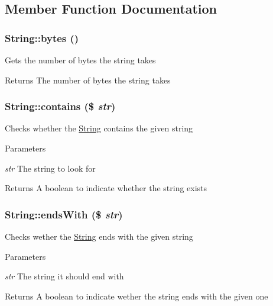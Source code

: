 \subsection{Member Function Documentation}
\hypertarget{classString_ae7254778c39de64320813d1da9f2f276}{
\subsubsection[{bytes}]{\setlength{\rightskip}{0pt plus 5cm}String::bytes ()}}
\label{classString_ae7254778c39de64320813d1da9f2f276}
Gets the number of bytes the string takes \begin{DoxyReturn}{Returns}
The number of bytes the string takes 
\end{DoxyReturn}
\hypertarget{classString_a459b87eb0e1fd06e68eb58b18ad11897}{
\subsubsection[{contains}]{\setlength{\rightskip}{0pt plus 5cm}String::contains (\$ {\em str})}}
\label{classString_a459b87eb0e1fd06e68eb58b18ad11897}
Checks whether the \hyperlink{classString}{String} contains the given string 
\begin{DoxyParams}{Parameters}
\item[{\em str}]The string to look for \end{DoxyParams}
\begin{DoxyReturn}{Returns}
A boolean to indicate whether the string exists 
\end{DoxyReturn}
\hypertarget{classString_aa3256858bec84d6ec1d3b7184725f8bd}{
\subsubsection[{endsWith}]{\setlength{\rightskip}{0pt plus 5cm}String::endsWith (\$ {\em str})}}
\label{classString_aa3256858bec84d6ec1d3b7184725f8bd}
Checks wether the \hyperlink{classString}{String} ends with the given string 
\begin{DoxyParams}{Parameters}
\item[{\em str}]The string it should end with \end{DoxyParams}
\begin{DoxyReturn}{Returns}
A boolean to indicate wether the string ends with the given one 
\end{DoxyReturn}
